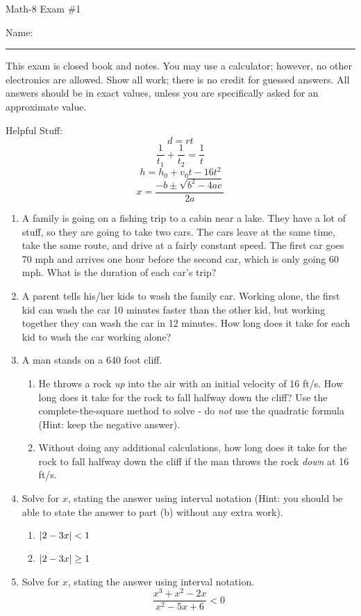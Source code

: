 \documentclass[letterpaper,12pt,fleqn]{article}
\begin{document}
\begin{center}
\Large Math-8 Exam \#1
\end{center}

\vspace{0.5in}

Name: \rule{4in}{1pt}

\vspace{0.5in}

This exam is closed book and notes. You may use a calculator; however, no other
electronics are allowed. Show all work; there is no credit for guessed
answers. All answers should be in exact values, unless you are specifically
asked for an approximate value.

\vspace{0.5in}

Helpful Stuff:
\[d=rt\]
\[\frac{1}{t_1}+\frac{1}{t_2}=\frac{1}{t}\]
\[h=h_0+v_0t-16t^2\]
\[x=\frac{-b\pm\sqrt{b^2-4ac}}{2a}\]
\newpage
\begin{enumerate}
\item A family is going on a fishing trip to a cabin near a lake. They have a
  lot of stuff, so they are going to take two cars. The cars leave at the same
  time, take the same route, and drive at a fairly constant speed. The first
  car goes 70 mph and arrives one hour before the second car, which is only
  going 60 mph. What is the duration of each car's trip?
\newpage
\item A parent tells his/her kids to wash the family car. Working alone, the
  first kid can wash the car 10 minutes faster than the other kid, but working
  together they can wash the car in 12 minutes. How long does it take for each
  kid to wash the car working alone?
\newpage
\item A man stands on a 640 foot cliff.
  \begin{enumerate}
  \item He throws a rock \emph{up} into the air with an initial velocity of 16
    ft/s. How long does it take for the rock to fall halfway down the cliff?
    Use the complete-the-square method to solve - do \emph{not} use the
    quadratic formula (Hint: keep the negative answer).
    \vspace{5in}
  \item Without doing any additional calculations, how long does it take for
    the rock to fall halfway down the cliff if the man throws the rock
    \emph{down} at 16 ft/s.
  \end{enumerate}
\newpage
\item Solve for $x$, stating the answer using interval notation (Hint: you
  should be able to state the answer to part (b) without any extra work).
  \begin{enumerate}
  \item $\lvert2-3x\rvert<1$
    \vspace{5in}
  \item $\lvert2-3x\rvert\ge1$
  \end{enumerate}
\newpage
\item Solve for $x$, stating the answer using interval notation.
  \[\frac{x^3+x^2-2x}{x^2-5x+6}<0\]
\end{enumerate}
\end{document}
